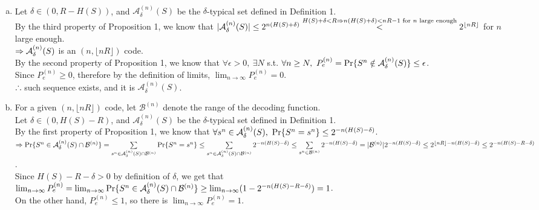 \begin{pr}$ $

\renewcommand{\A}{{\mathcal{A}_\delta^{(n)}(S)}}
\renewcommand{\B}{{\mathcal{B}^{(n)}}}

\begin{enumerate}[(a)]

\item Let $\delta\in(0, R-H(S))$, and $\A$ be the $\delta$-typical set defined in Definition 1.\\
By the third property of Proposition 1, we know that $|\A|\leq2^{n(H(S)+\delta)}\\
\overset{H(S)+\delta<R\then n(H(S)+\delta)<nR-1\text{ for }n\text{ large enough}}<2^{\lfloor nR\rfloor}$ for $n$ large enough.\\
$\then\A$ is an $(n, \lfloor nR\rfloor)$ code.\\
By the second property of Proposition 1, we know that $\forall\epsilon>0,\ \exists N$ s.t. $\forall n\geq N,\ P_e^{(n)}=\P\{S^n\notin\A\}\leq\epsilon$.\\
Since $P_e^{(n)}\geq0$, therefore by the definition of limits, $\lim_{n\to\infty}P_e^{(n)}=0$.\\
$\therefore$ such sequence exists, and it is $\A$.

\item For a given $(n, \lfloor nR\rfloor)$ code, let $\B$ denote the range of the	decoding function.\\
Let $\delta\in(0, H(S)-R)$, and $\A$ be the $\delta$-typical set defined in Definition 1.\\
By the first property of Proposition 1, we know that $\forall s^n\in\A,\ \P\{S^n=s^n\}\leq2^{-n(H(S)-\delta)}$.\\
$\then\P\{S^n\in\A\cap\B\}=\suml_{s^n\in\A\cap\B}\P\{S^n=s^n\}\leq\suml_{s^n\in\A\cap\B}2^{-n(H(S)-\delta)}\leq\suml_{s^n\in\B}2^{-n(H(S)-\delta)}=|\B|2^{-n(H(S)-\delta)}\leq2^{\lfloor nR\rfloor-n(H(S)-\delta)}\leq2^{-n(H(S)-R-\delta)}$.\\
Since $H(S)-R-\delta>0$ by definition of $\delta$, we get that $\lim_{n\to\infty}P_e^{(n)}=\lim_{n\to\infty}\P\{S^n\in\A\cap\B\}\geq\lim_{n\to\infty}(1-2^{-n(H(S)-R-\delta)})=1$.\\
On the other hand, $P_e^{(n)}\leq1$, so there is $\lim_{n\to\infty}P_e^{(n)}=1$.

\end{enumerate}
\end{pr}
